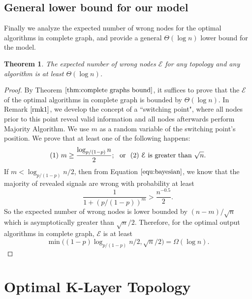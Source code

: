 \documentclass[a4paper,UKenglish]{lipics}
\newtheorem{thm}{Theorem}[section] %
\theoremstyle{definition}
\begin{document}
\subsection{General lower bound for our model}
Finally we analyze the expected number of wrong nodes for the optimal algorithms in complete graph, 
	and provide a general $\Theta(\log n)$ lower bound for the model.
	
\begin{thm}
\label{thm:general lower bound}
The expected number of wrong nodes $\mathcal{E}$ for any topology and any algorithm is at least $\Theta(\log n)$.
\end{thm}

\begin{proof}
By Theorem $\ref{thm:complete graphs bound}$, it suffices to prove that 
	the $\mathcal{E}$ of the optimal algorithms in complete graph is bounded by $\Theta(\log n)$.
In Remark $\ref{rmk1}$, we develop the concept of a ``switching point", 
	where all nodes prior to this point reveal valid information and all nodes afterwards perform Majority Algorithm.
We use $m$ as a random variable of the switching point's position.
We prove that at least one of the following happens:
\begin{equation*}
(1)~m\geq {\log_{p/(1-p)}n \over 2}; \text{~ or ~} 
(2)~\mathcal{E} \text{ is greater than } \sqrt{n}.
\end{equation*}
If $m<\log_{p / (1-p)} n \Big/ 2$, then from Equation $\eqref{equ:bayesian}$, we know that the majority of revealed signals are wrong
	with probability at least 
\begin{equation*}
	\frac{1}{1 + (p/(1-p))^m} 
	> 
	\frac{n^{-0.5}}{2}.
\end{equation*}
So the expected number of wrong nodes is lower bounded by $ {(n-m)} / {\sqrt{n}}$ which is asymptotically greater than ${\sqrt{n}}/2$. 
Therefore, for the optimal output algorithms in complete graph, $\mathcal{E}$ is at least
\begin{equation*}
	\min \Big((1 - p) \log_{p/(1-p)}n \Big/ 2,  \sqrt{n} \Big/2 \Big) 
	= 
	\Omega(\log n).
\end{equation*}
\end{proof}









\section {Optimal K-Layer Topology}
\end{document}
